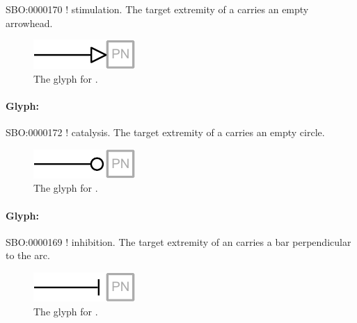 \begin{glyphDescription}
 \glyphSboTerm SBO:0000170 ! stimulation.
 \glyphEndPoint The target extremity of a  carries an empty arrowhead.
 \end{glyphDescription}

\begin{figure}[htb]
  \centering
  \includegraphics[scale = 0.5]{images/stimulation}
  \caption{The \PD glyph for .}
  \label{fig:techref:stimulation}
\end{figure}


\paragraph{Glyph: }\label{sec:techref:catalysis}


\begin{glyphDescription}
 \glyphSboTerm SBO:0000172 ! catalysis.
 \glyphNode The target extremity of a  carries an empty circle.
 \end{glyphDescription}

\begin{figure}[htb]
  \centering
  \includegraphics[scale = 0.5]{images/catalysis}
  \caption{The \PD glyph for .}
  \label{fig:techref:catalysis}
\end{figure}


\paragraph{Glyph: }\label{sec:techref:inhibition}


\begin{glyphDescription}
 \glyphSboTerm SBO:0000169 ! inhibition.
 \glyphNode The target extremity of an  carries a bar perpendicular to the arc.
 \end{glyphDescription}

\begin{figure}[htb]
  \centering
  \includegraphics[scale = 0.5]{images/inhibition}
  \caption{The \PD glyph for .}
  \label{fig:techref:inhibition}
\end{figure}


